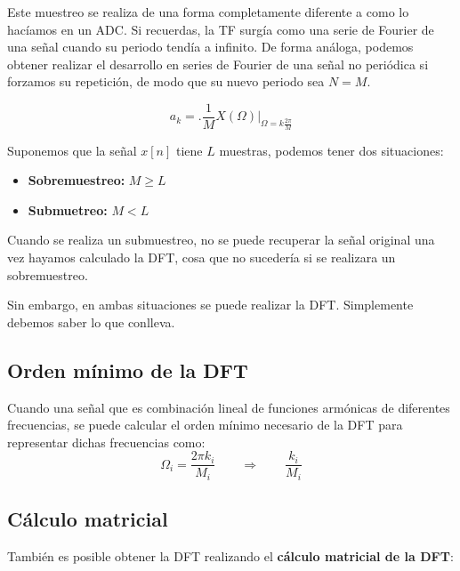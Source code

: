 \documentclass[a4paper,oneside]{book}
\begin{document}
Este muestreo se realiza de una forma completamente diferente a como lo hacíamos en un ADC. Si recuerdas, la TF surgía como una serie de Fourier de una señal cuando su periodo tendía a infinito. De forma análoga, podemos obtener realizar el desarrollo en series de Fourier de una señal no periódica si forzamos su repetición, de modo que su nuevo periodo sea $N = M$.

\[ a_k = \biggl. \frac{1}{M} X(\Omega ) \biggr\vert _{\Omega = k \frac{2\pi}{M}}\]

Suponemos que la señal $x[n]$ tiene $L$ muestras, podemos tener dos situaciones:
\begin{multicols}{2}
	\begin{itemize}
		\item \textbf{Sobremuestreo:} $\boxed{M\geq L}$
		\item \textbf{Submuetreo:} $\boxed{M<L}$
	\end{itemize}
\end{multicols}

Cuando se realiza un submuestreo, no se puede recuperar la señal original una vez hayamos calculado la DFT, cosa que no sucedería si se realizara un sobremuestreo.

Sin embargo, en ambas situaciones se puede realizar la DFT. Simplemente debemos saber lo que conlleva.

\subsection{Orden mínimo de la DFT}

Cuando una señal que es combinación lineal de funciones armónicas de diferentes frecuencias, se puede calcular el orden mínimo necesario de la DFT para representar dichas frecuencias como:
\[ \Omega_i = \frac{2\pi k_i}{M_i} \qquad \Longrightarrow \qquad \boxed{\frac{k_i}{M_i}} \]

\subsection{Cálculo matricial}

También es posible obtener la DFT realizando el \textbf{cálculo matricial de la DFT}:
\end{document}
